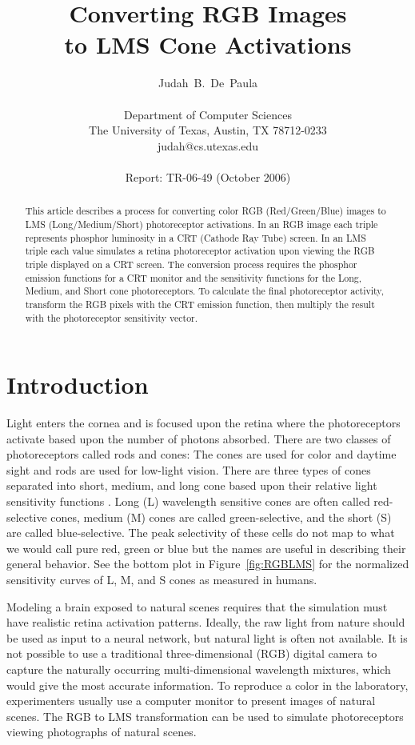 \documentclass[12pt]{article}
\title{{\bf Converting RGB Images\\to LMS Cone Activations}}
\author{Judah~B.~De~Paula\\\\
Department of Computer Sciences\\
The University of Texas, Austin, TX 78712-0233\\
judah@cs.utexas.edu\\\\
Report: TR-06-49 (October 2006)
}
\date{}
\begin{document}
\maketitle

\begin{abstract}

    This article describes a process for converting color RGB
    (Red/Green/Blue) images to LMS (Long/Medium/Short) photoreceptor
    activations.  In an RGB image each triple represents phosphor
    luminosity in a CRT (Cathode Ray Tube) screen.  In an LMS triple
    each value simulates a retina photoreceptor activation upon
    viewing the RGB triple displayed on a CRT screen.  The conversion
    process requires the phosphor emission functions for a CRT monitor
    and the sensitivity functions for the Long, Medium, and Short cone
    photoreceptors.  To calculate the final photoreceptor activity,
    transform the RGB pixels with the CRT emission function, then
    multiply the result with the photoreceptor sensitivity vector.

\end{abstract}



\section{Introduction}
\label{sec:intro}

Light enters the cornea and is focused upon the retina where the
photoreceptors activate based upon the number of photons absorbed.
There are two classes of photoreceptors called rods and cones: The
cones are used for color and daytime sight and rods are used for
low-light vision.  There are three types of cones separated into
short, medium, and long cone based upon their relative light
sensitivity functions \cite{stockman:vr99,stockman:vr00b}.  Long (L)
wavelength sensitive cones are often called red-selective cones,
medium (M) cones are called green-selective, and the short (S) are
called blue-selective.  The peak selectivity of these cells do not map
to what we would call pure red, green or blue but the names are useful
in describing their general behavior.  See the bottom plot in
Figure~\ref{fig:RGBLMS} for the normalized sensitivity curves of L, M,
and S cones as measured in humans.

Modeling a brain exposed to natural scenes requires that the
simulation must have realistic retina activation patterns.  Ideally,
the raw light from nature should be used as input to a neural network,
but natural light is often not available.  It is not possible to use a
traditional three-dimensional (RGB) digital camera to capture the
naturally occurring multi-dimensional wavelength mixtures, which would
give the most accurate information.  To reproduce a color in the
laboratory, experimenters usually use a computer monitor to present
images of natural scenes.  The RGB to LMS transformation can be used
to simulate photoreceptors viewing photographs of natural scenes.
\end{document}
